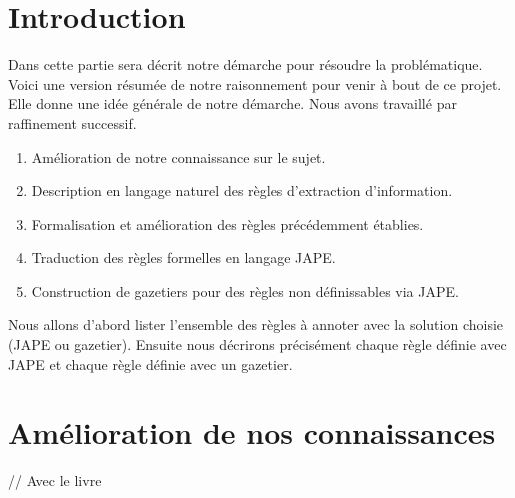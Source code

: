 \documentclass[a4paper, 11pt]{book}
\begin{document}
\section*{Introduction}
Dans cette partie sera décrit notre démarche pour résoudre la problématique. 
Voici une version résumée de notre raisonnement pour venir à bout de ce projet. Elle donne une idée générale de notre démarche. Nous avons travaillé par raffinement successif.
\begin{enumerate}
\item Amélioration de notre connaissance sur le sujet.
\item Description en langage naturel des règles d'extraction d'information.
\item Formalisation et amélioration des règles précédemment établies.
\item Traduction des règles formelles en langage JAPE.
\item Construction de gazetiers pour des règles non définissables via JAPE.
\end{enumerate}
Nous allons d'abord lister l'ensemble des règles à annoter avec la solution choisie (JAPE ou gazetier). Ensuite nous décrirons précisément chaque règle définie avec JAPE et chaque règle définie avec un gazetier.

\section{Amélioration de nos connaissances}
// Avec le livre 

\newpage
\end{document}
